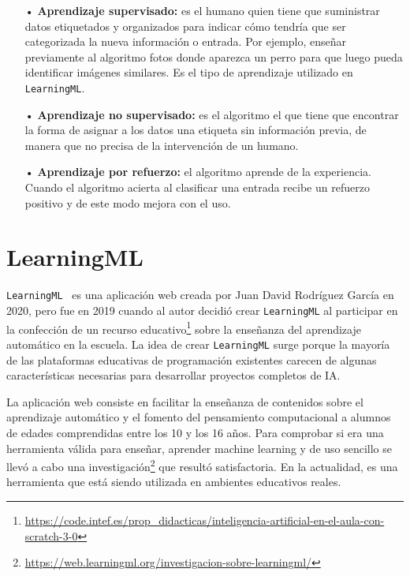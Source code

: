 \documentclass[a4paper, 12pt]{book}
\begin{document}
\begin{itemize}

	\item[•] \textbf{Aprendizaje supervisado:} es el humano quien tiene que suministrar datos etiquetados y organizados para indicar cómo tendría que ser categorizada la nueva información o entrada. 
	Por ejemplo, enseñar previamente al algoritmo fotos donde aparezca un perro para que luego pueda identificar imágenes similares. 
	Es el tipo de aprendizaje utilizado en \texttt{LearningML}.
	
	\item[•] \textbf{Aprendizaje no supervisado:} es el algoritmo el que tiene que encontrar la forma de asignar a los datos una etiqueta sin información previa, de manera que no precisa de la intervención de un humano.
	
	\item[•] \textbf{Aprendizaje por refuerzo:} el algoritmo aprende de la experiencia. 
	Cuando el algoritmo acierta al clasificar una entrada recibe un refuerzo positivo y de este modo mejora con el uso.
	
\end{itemize}

\section{LearningML} 
\label{sec:LearningML}

\texttt{LearningML}~\cite{Pagina_de_LearningML} es una aplicación web creada por Juan David Rodríguez García en 2020, pero fue en 2019 cuando al autor decidió crear \texttt{LearningML} al participar en la confección de un recurso educativo\footnote{\url{https://code.intef.es/prop_didacticas/inteligencia-artificial-en-el-aula-con-scratch-3-0}}  sobre la enseñanza del aprendizaje automático en la escuela. 
La idea de crear \texttt{LearningML} surge porque la mayoría de las plataformas educativas de programación existentes carecen de algunas características necesarias para desarrollar proyectos completos de IA.

La aplicación web consiste en facilitar la enseñanza de contenidos sobre el aprendizaje automático y el fomento del pensamiento computacional a alumnos de edades comprendidas entre los 10 y los 16 años. 
Para comprobar si era una herramienta válida para enseñar, aprender machine learning y de uso sencillo se llevó a cabo una investigación\footnote{\url{https://web.learningml.org/investigacion-sobre-learningml/}} que resultó satisfactoria. 
En la actualidad, es una herramienta que está siendo utilizada en ambientes educativos reales.
\end{document}
